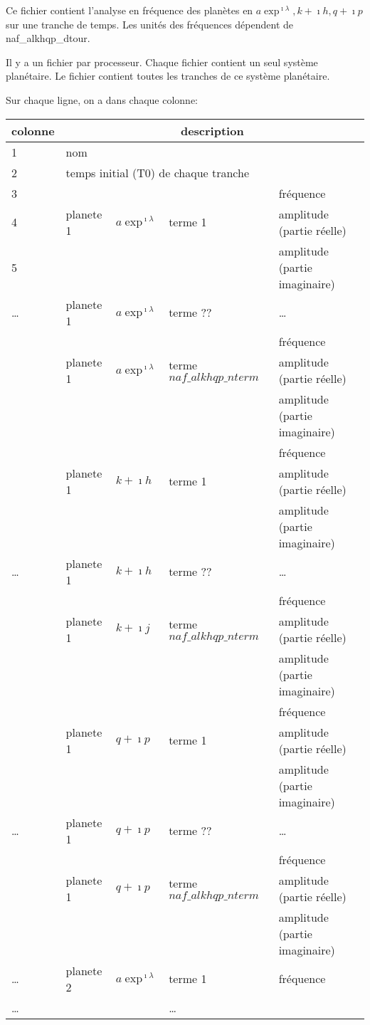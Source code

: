 \documentclass[11pt]{article}
\begin{document}
Ce fichier contient l'analyse en fr\'equence des plan\`etes en $a\exp^{\imath\lambda}, k+\imath h, q+\imath p$ sur une tranche de temps. Les unit\'es des fr\'equences d\'ependent de naf\_alkhqp\_dtour.

Il y a un fichier par processeur. Chaque fichier contient un seul syst\`eme plan\'etaire. Le fichier contient toutes les tranches de ce syst\`eme plan\'etaire.


Sur chaque ligne, on a dans chaque colonne: 

\begin{tabularx}{\textwidth}{|l|l|l|l|X|}
 \hline
 colonne &      \multicolumn{4}{c|}{description} \\ \hline
1  &    \multicolumn{4}{l|}{nom} \\ \hline
2  &    \multicolumn{4}{l|}{temps initial (T0) de chaque tranche} \\ \hline
3 & &   & & fr\'equence\\
4 &planete 1 &$a\exp^{\imath\lambda}$& terme 1 & amplitude (partie r\'eelle)\\
5 & &   & &amplitude (partie imaginaire)\\ \hline
\dots & planete 1 &$a\exp^{\imath\lambda}$& terme ?? &\dots \\ \hline
 & &   & &fr\'equence\\
 &planete 1 & $a\exp^{\imath\lambda}$ & terme $naf\_alkhqp\_nterm$ & amplitude (partie r\'eelle)\\
 & &   & &amplitude (partie imaginaire)\\ \hline
 & &   & & fr\'equence\\
 &planete 1 &$k+\imath h$& terme 1 & amplitude (partie r\'eelle)\\
 & &   & &amplitude (partie imaginaire)\\ \hline
\dots & planete 1 &$k+\imath h$& terme ?? &\dots \\ \hline
 & &   & &fr\'equence\\
 &planete 1 & $k+\imath j$ & terme $naf\_alkhqp\_nterm$ & amplitude (partie r\'eelle)\\
 & &   & &amplitude (partie imaginaire)\\ \hline
& &   & & fr\'equence\\
 &planete 1 &$q+\imath p$& terme 1 & amplitude (partie r\'eelle)\\
 & &   & &amplitude (partie imaginaire)\\ \hline
\dots & planete 1 &$q+\imath p$& terme ?? &\dots \\ \hline
 & &   & &fr\'equence\\
 &planete 1 & $q+\imath p$ & terme $naf\_alkhqp\_nterm$ & amplitude (partie r\'eelle)\\
 & &   & &amplitude (partie imaginaire)\\ \hline
\dots & planete 2 &$a\exp^{\imath\lambda}$& terme 1 &fr\'equence \\ \hline
\dots & & & \dots &\\\hline
\end{tabularx}
\end{document}
